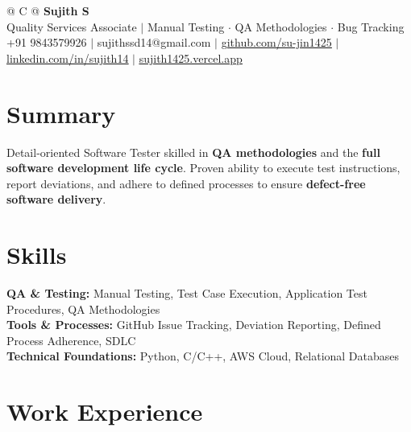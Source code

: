 \documentclass[a4paper,10pt]{article}
\newcommand{\ulink}[2]{\href{#1}{\uline{#2}}}
\begin{document}
\pagestyle{empty}

\begin{tabularx}{\linewidth}{@{} C @{}}
{\color[HTML]{000000}\fontsize{30}{35}\selectfont\bfseries Sujith S} \\[5pt]
{\fontsize{10.5}{12.5}\selectfont\color[HTML]{3A3A3A}
Quality Services Associate $|$ Manual Testing $\cdot$ QA Methodologies $\cdot$ Bug Tracking} \\[6pt]
{\fontsize{9.5}{11.5}\selectfont\textcolor[HTML]{3A3A3A}{+91 9843579926 $|$ sujithssd14@gmail.com $|$ \ulink{https://github.com/su-jin1425}{github.com/su-jin1425} $|$ \ulink{https://linkedin.com/in/sujith14}{linkedin.com/in/sujith14} $|$ \ulink{https://sujith1425.vercel.app}{sujith1425.vercel.app}}}
\end{tabularx}

\vspace{2pt}

\section{Summary}
\vspace{3pt}
{\color[HTML]{0A0A0A}\fontsize{11}{14}\selectfont
Detail-oriented Software Tester skilled in \textbf{QA methodologies} and the \textbf{full software development life cycle}. Proven ability to execute test instructions, report deviations, and adhere to defined processes to ensure \textbf{defect-free software delivery}.}

\vspace{2pt}

\section{Skills}
\vspace{3pt}
{\color[HTML]{0A0A0A}\fontsize{11}{14}\selectfont
\textbf{QA \& Testing:} Manual Testing, Test Case Execution, Application Test Procedures, QA Methodologies \\[2pt]
\textbf{Tools \& Processes:} GitHub Issue Tracking, Deviation Reporting, Defined Process Adherence, SDLC \\[2pt]
\textbf{Technical Foundations:} Python, C/C++, AWS Cloud, Relational Databases}

\vspace{2pt}

\section{Work Experience}
\vspace{2pt}
\end{document}
